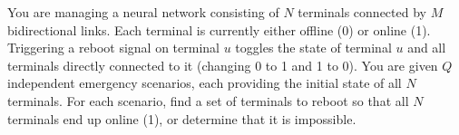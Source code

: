 You are managing a neural network consisting of $N$ terminals connected by $M$ bidirectional links. Each terminal is currently either offline (0) or online (1). Triggering a reboot signal on terminal $u$ toggles the state of terminal $u$ and all terminals directly connected to it (changing 0 to 1 and 1 to 0). You are given $Q$ independent emergency scenarios, each providing the initial state of all $N$ terminals. For each scenario, find a set of terminals to reboot so that all $N$ terminals end up online (1), or determine that it is impossible.